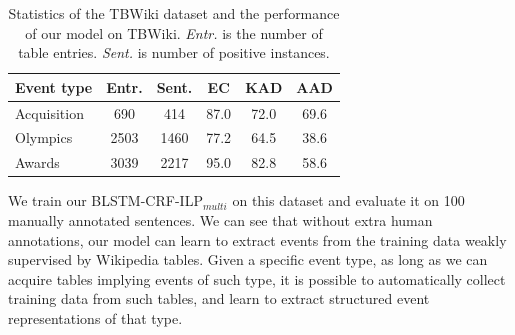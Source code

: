 \begin{table}[h]
\small
\centering
\begin{tabular}{|l|c|c|c|c|c|} \hline
	Event type & Entr. & Sent. & EC & KAD & AAD \\ \hline
	Acquisition & 690 & 414 & 87.0 & 72.0 & 69.6 \\ \hline
	Olympics & 2503 & 1460 & 77.2 & 64.5 & 38.6 \\ \hline
	Awards & 3039 & 2217 & 95.0 & 82.8 & 58.6 \\ \hline
\end{tabular}
\caption{Statistics of the TBWiki dataset and the performance of our model on TBWiki. \textit{Entr.} is the number of table entries. \textit{Sent.} is number of positive instances.\label{tab:6}}
\end{table}

We train our BLSTM-CRF-ILP$_{multi}$ on this dataset and evaluate it on 100 manually annotated sentences.
We can see that without extra human annotations, %
our model can learn to extract events from the training data weakly supervised by Wikipedia tables. Given a specific event type, as long as we can acquire tables implying events of such type, it is possible to automatically collect training data from such tables, and learn to extract structured event representations of that type. %


